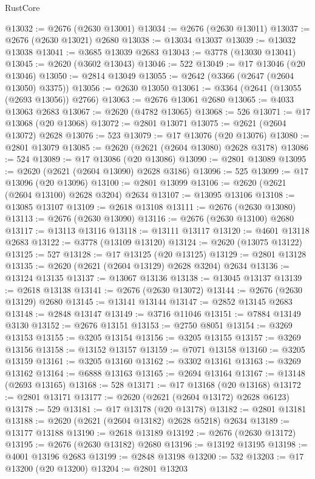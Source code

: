\begin{lexlean}{RustCore}
\begin{coremodule}
@13032 := @2676 (@2630 @13001)
@13034 := @2676 (@2630 @13011)
@13037 := @2676 (@2630 @13021) @2680
@13038 := @13034 @13037
@13039 := @13032 @13038
@13041 := @3685 @13039 @2683
@13043 := @3778 (@13030 @13041)
@13045 := @2620 (@3602 @13043)
@13046 := 522
@13049 := @17 @13046 (@20 @13046)
@13050 := @2814 @13049
@13055 := @2642 (@3366 (@2647 (@2604 @13050) @3375))
@13056 := @2630 @13050
@13061 := @3364 (@2641 (@13055 (@2693 @13056)) @2766)
@13063 := @2676 @13061 @2680
@13065 := @4033 @13063 @2683
@13067 := @2620 (@4782 @13065)
@13068 := 526
@13071 := @17 @13068 (@20 @13068)
@13072 := @2801 @13071
@13075 := @2621 (@2604 @13072) @2628
@13076 := 523
@13079 := @17 @13076 (@20 @13076)
@13080 := @2801 @13079
@13085 := @2620 (@2621 (@2604 @13080) @2628 @3178)
@13086 := 524
@13089 := @17 @13086 (@20 @13086)
@13090 := @2801 @13089
@13095 := @2620 (@2621 (@2604 @13090) @2628 @3186)
@13096 := 525
@13099 := @17 @13096 (@20 @13096)
@13100 := @2801 @13099
@13106 := @2620 (@2621 (@2604 @13100) @2628 @3204) @2634
@13107 := @13095 @13106
@13108 := @13085 @13107
@13109 := @2618 @13108
@13111 := @2676 (@2630 @13080)
@13113 := @2676 (@2630 @13090)
@13116 := @2676 (@2630 @13100) @2680
@13117 := @13113 @13116
@13118 := @13111 @13117
@13120 := @4601 @13118 @2683
@13122 := @3778 (@13109 @13120)
@13124 := @2620 (@13075 @13122)
@13125 := 527
@13128 := @17 @13125 (@20 @13125)
@13129 := @2801 @13128
@13135 := @2620 (@2621 (@2604 @13129) @2628 @3204) @2634
@13136 := @13124 @13135
@13137 := @13067 @13136
@13138 := @13045 @13137
@13139 := @2618 @13138
@13141 := @2676 (@2630 @13072)
@13144 := @2676 (@2630 @13129) @2680
@13145 := @13141 @13144
@13147 := @2852 @13145 @2683
@13148 := @2848 @13147
@13149 := @3716 @11046
@13151 := @7884 @13149 @3130
@13152 := @2676 @13151
@13153 := @2750 @8051
@13154 := @3269 @13153
@13155 := @3205 @13154
@13156 := @3205 @13155
@13157 := @3269 @13156
@13158 := @13152 @13157
@13159 := @7071 @13158
@13160 := @3205 @13159
@13161 := @3205 @13160
@13162 := @3302 @13161
@13163 := @3269 @13162
@13164 := @6888 @13163
@13165 := @2694 @13164
@13167 := @13148 (@2693 @13165)
@13168 := 528
@13171 := @17 @13168 (@20 @13168)
@13172 := @2801 @13171
@13177 := @2620 (@2621 (@2604 @13172) @2628 @6123)
@13178 := 529
@13181 := @17 @13178 (@20 @13178)
@13182 := @2801 @13181
@13188 := @2620 (@2621 (@2604 @13182) @2628 @5218) @2634
@13189 := @13177 @13188
@13190 := @2618 @13189
@13192 := @2676 (@2630 @13172)
@13195 := @2676 (@2630 @13182) @2680
@13196 := @13192 @13195
@13198 := @4001 @13196 @2683
@13199 := @2848 @13198
@13200 := 532
@13203 := @17 @13200 (@20 @13200)
@13204 := @2801 @13203

\end{coremodule}
\end{lexlean}
